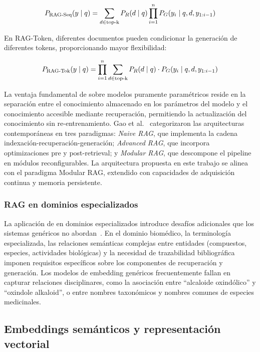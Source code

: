 \begin{equation}
\label{eq:rag_sequence}
  P_{\text{RAG-Seq}}(y \mid q) = \sum_{d \in \operatorname{top\text{-}k}} P_R(d \mid q) \prod_{i=1}^{n} P_G(y_i \mid q, d, y_{1:i-1})
\end{equation}

En RAG-Token, diferentes documentos pueden condicionar la generación de diferentes tokens, proporcionando mayor flexibilidad:

\begin{equation}
\label{eq:rag_token}
  P_{\text{RAG-Tok}}(y \mid q) = \prod_{i=1}^{n} \sum_{d \in \operatorname{top\text{-}k}} P_R(d \mid q) \cdot P_G(y_i \mid q, d, y_{1:i-1})
\end{equation}

La ventaja fundamental de \rag{} sobre modelos puramente paramétricos reside en la separación entre el conocimiento almacenado en los parámetros del modelo y el conocimiento accesible mediante recuperación, permitiendo la actualización del conocimiento sin re-entrenamiento. Gao et al.~\cite{gao2024retrieval} categorizaron las arquitecturas \rag{} contemporáneas en tres paradigmas: \textit{Naive RAG}, que implementa la cadena indexación-recuperación-generación; \textit{Advanced RAG}, que incorpora optimizaciones pre y post-retrieval; y \textit{Modular RAG}, que descompone el pipeline en módulos reconfigurables. La arquitectura propuesta en este trabajo se alinea con el paradigma Modular RAG, extendido con capacidades de adquisición continua y memoria persistente.

\subsubsection{RAG en dominios especializados}

La aplicación de \rag{} en dominios especializados introduce desafíos adicionales que los sistemas genéricos no abordan~\cite{siriwardhana2023improving}. En el dominio biomédico, la terminología especializada, las relaciones semánticas complejas entre entidades (compuestos, especies, actividades biológicas) y la necesidad de trazabilidad bibliográfica imponen requisitos específicos sobre los componentes de recuperación y generación. Los modelos de embedding genéricos frecuentemente fallan en capturar relaciones disciplinares, como la asociación entre ``alcaloide oxindólico'' y ``oxindole alkaloid'', o entre nombres taxonómicos y nombres comunes de especies medicinales.

\subsection{Embeddings semánticos y representación vectorial}
\label{subsec:tf_embeddings}

